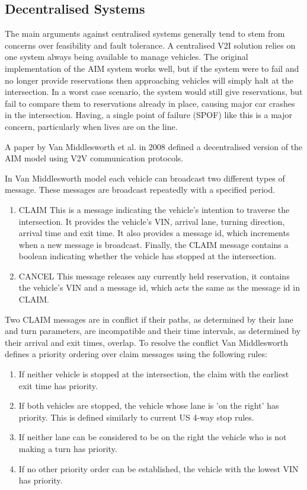 \subsection{Decentralised Systems}
\label{subsec:Decentralised Systems}
The main arguments against centralised systems generally tend to stem from concerns over feasibility and fault tolerance. A centralised V2I solution relies on one system always being available to manage vehicles. The original implementation of the AIM system works well, but if the system were to fail and no longer provide reservations then approaching vehicles will simply halt at the intersection. In a worst case scenario, the system would still give reservations, but fail to compare them to reservations already in place, causing major car crashes in the intersection. Having, a single point of failure (SPOF) like this is a major concern, particularly when lives are on the line.

A paper by Van Middlesworth et al. in 2008 \citep{VanMiddlesworth2008} defined a decentralised version of the AIM model using V2V communication protocols. 

In Van Middlesworth model each vehicle can broadcast two different types of message. These messages are broadcast repeatedly with a specified period.
\begin{enumerate}
\item CLAIM
This is a message indicating the vehicle's intention to traverse the intersection. It provides the vehicle's VIN, arrival lane, turning direction, arrival time and exit time. It also provides a message id, which increments when a new message is broadcast. Finally, the CLAIM message contains a boolean indicating whether the vehicle has stopped at the intersection.
\item CANCEL
This message releases any currently held reservation, it contains the vehicle's VIN and a message id, which acts the same as the message id in CLAIM.
\end{enumerate}

Two CLAIM messages are in conflict if their paths, as determined by their lane and turn parameters, are incompatible and their time intervals, as determined by their arrival and exit times, overlap. To resolve the conflict Van Middlesworth defines a priority ordering over claim messages using the following rules:
\begin{enumerate}
\item If neither vehicle is stopped at the intersection, the claim with the earliest exit time has priority.
\item If both vehicles are stopped, the vehicle whose lane is 'on the right' has priority. This is defined similarly to current US 4-way stop rules.
\item If neither lane can be considered to be on the right the vehicle who is not making a turn has priority.
\item If no other priority order can be established, the vehicle with the lowest VIN has priority.
\end{enumerate}

